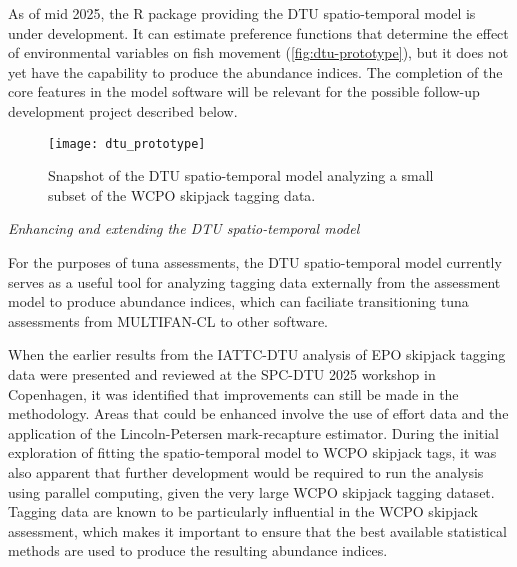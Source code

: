 \documentclass{SCreport}
\begin{document}
As of mid 2025, the R package providing the DTU spatio-temporal model is under
development. It can estimate preference functions that determine the effect of
environmental variables on fish movement (\autoref{fig:dtu-prototype}), but it
does not yet have the capability to produce the abundance indices. The
completion of the core features in the model software will be relevant for the
possible follow-up development project described below.

\begin{figure}
  \centering
  \texttt{[image: dtu\_prototype]}
  \caption{Snapshot of the DTU spatio-temporal model analyzing a small subset of
    the WCPO skipjack tagging data.\label{fig:dtu-prototype}}
\end{figure}

\vspace{2ex}

\textit{Enhancing and extending the DTU spatio-temporal model}

For the purposes of tuna assessments, the DTU spatio-temporal model currently
serves as a useful tool for analyzing tagging data externally from the
assessment model to produce abundance indices, which can faciliate transitioning
tuna assessments from MULTIFAN-CL to other software.

When the earlier results from the IATTC-DTU analysis of EPO skipjack tagging
data were presented and reviewed at the SPC-DTU 2025 workshop in Copenhagen, it
was identified that improvements can still be made in the methodology. Areas
that could be enhanced involve the use of effort data and the application of the
Lincoln-Petersen mark-recapture estimator. During the initial exploration of
fitting the spatio-temporal model to WCPO skipjack tags, it was also apparent
that further development would be required to run the analysis using parallel
computing, given the very large WCPO skipjack tagging dataset. Tagging data are
known to be particularly influential in the WCPO skipjack assessment, which
makes it important to ensure that the best available statistical methods are
used to produce the resulting abundance indices.
\end{document}
